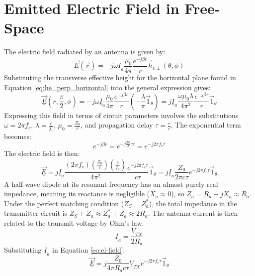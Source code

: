 \section{Emitted Electric Field in Free-Space}
The electric field radiated by an antenna is given by:
\begin{equation}
	\underline{\vec{E}}(\vec{r}) = -j\omega \underline{I}_a \frac{\mu_0}{4\pi} \frac{e^{-j\beta r}}{r} \vec{h}_{e\perp}(\theta, \phi)
\end{equation}
\vspace{0.5em}
Substituting the transverse effective height for the horizontal plane found in Equation \eqref{eq:he_perp_horizontal} into the general expression gives:
\begin{equation}
	\underline{\vec{E}}(r, \frac{\pi}{2}, \phi) = -j\omega \underline{I}_a \frac{\mu_0}{4\pi} \frac{e^{-j\beta r}}{r} \left(-\frac{\lambda}{\pi} \vec{1}_\theta\right) = j \underline{I}_a \frac{\omega \mu_0 \lambda}{4\pi^2} \frac{e^{-j\beta r}}{r} \vec{1}_\theta
\end{equation}
\vspace{0.5em}
Expressing this field in terms of circuit parameters involves the substitutions $\omega = 2\pi f_c$, $\lambda = \frac{c}{f_c}$, $\mu_0 = \frac{Z_0}{c}$, and propagation delay $\tau = \frac{r}{c}$. The exponential term becomes:
\begin{equation}
	e^{-j\beta r} = e^{-j\frac{2\pi}{\lambda}c\tau} = e^{-j2\pi f_c \tau}
\end{equation}
\vspace{0.5em}
The electric field is then:
\begin{equation}
	\underline{\vec{E}} = j \underline{I}_a \frac{(2\pi f_c) (\frac{Z_0}{c}) (\frac{c}{f_c})}{4\pi^2} \frac{e^{-j2\pi f_c \tau}}{c\tau} \vec{1}_\theta = j \underline{I}_a \frac{Z_0}{2\pi c\tau} e^{-j2\pi f_c \tau} \vec{1}_\theta
	\label{eq:el-field}
\end{equation}
\vspace{0.5em}
A half-wave dipole at its resonant frequency has an almost purely real impedance, meaning its reactance is negligible ($X_a \approx 0$), so $Z_a = R_a + jX_a \approx R_a$. Under the perfect matching condition ($Z_S = Z_a^*$), the total impedance in the transmitter circuit is $Z_S + Z_a \approx Z_a^* + Z_a \approx 2R_a$. The antenna current is then related to the transmit voltage by Ohm's law:
\begin{equation}
	\underline{I}_a = \frac{\underline{V}_{TX}}{2R_a}
\end{equation}
\vspace{0.5em}
Substituting $\underline{I}_a$ in Equation \eqref{eq:el-field}:
\begin{equation}
	\boxed{\underline{\vec{E}} = j \frac{Z_0}{4\pi R_a c\tau} \underline{V}_{TX} e^{-j2\pi f_c \tau} \vec{1}_\theta}
	\label{eq:E_field_final}
\end{equation}

